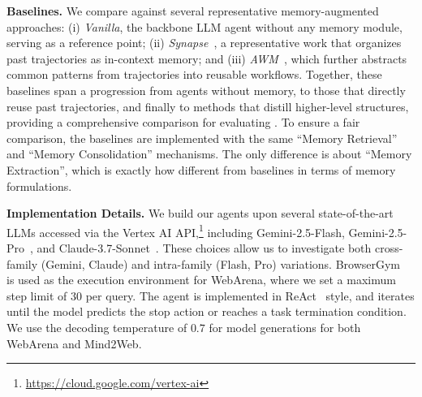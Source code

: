 \noindent\textbf{Baselines.} 
We compare \ours{} against several representative memory-augmented approaches: 
(i) \textit{Vanilla}, the backbone LLM agent without any memory module, serving as a reference point; 
(ii) \textit{Synapse}~\citep{zheng2024synapse}, a representative work that organizes past trajectories as in-context memory; and 
(iii) \textit{AWM}~\citep{wang2025agent}, which further abstracts common patterns from trajectories into reusable workflows.
Together, these baselines span a progression from agents without memory, to those that directly reuse past trajectories, and finally to methods that distill higher-level structures, providing a comprehensive comparison for evaluating \ours{}. 
To ensure a fair comparison, the baselines are implemented with the same ``Memory Retrieval'' and ``Memory Consolidation'' mechanisms. The only difference is about ``Memory Extraction'', which is exactly how \ours{} different from baselines in terms of memory formulations.


\noindent\textbf{Implementation Details.} We build our agents upon several state-of-the-art LLMs accessed via the Vertex AI API,\footnote{\url{https://cloud.google.com/vertex-ai}} including Gemini-2.5-Flash, Gemini-2.5-Pro~\citep{comanici2025gemini}, and Claude-3.7-Sonnet~\citep{Anthropic}. 
These choices allow us to investigate both cross-family (Gemini, Claude) and intra-family (Flash, Pro) variations.
BrowserGym~\citep{chezelles2025browsergym} is used as the execution environment for WebArena, where we set a maximum step limit of $30$ per query. The agent is implemented in ReAct~\citep{yao2023react} style, and iterates until the model predicts the stop action or reaches a task termination condition. We use the decoding temperature of $0.7$ for model generations for both WebArena and Mind2Web. 

